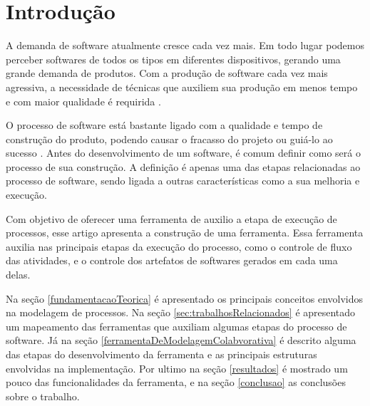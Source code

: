 \section{Introdução}\label{introducao}
A demanda de software atualmente cresce cada vez mais. Em todo lugar podemos perceber softwares de todos os tipos em diferentes dispositivos, gerando uma grande demanda de produtos. Com a produção de software cada vez mais agressiva, a necessidade de técnicas que auxiliem sua produção em menos tempo e com maior qualidade é requirida \cite{larman2007utilizando}.

O processo de software está bastante ligado com a qualidade e tempo de construção do produto, podendo causar o fracasso do projeto ou guiá-lo ao sucesso \cite{sommerville2007engenharia}.  Antes do desenvolvimento de um software, é comum definir como será o processo de sua construção. A definição é apenas uma das etapas relacionadas ao processo de software, sendo ligada a outras características como a sua melhoria e execução.

Com objetivo de oferecer uma ferramenta de auxilio a etapa de execução de processos, esse artigo apresenta a construção de uma ferramenta. Essa ferramenta auxilia nas principais etapas da execução do processo, como o controle de fluxo das atividades, e o controle dos artefatos de softwares gerados em cada uma delas.

Na seção \ref{fundamentacaoTeorica} é apresentado os principais conceitos envolvidos na modelagem de processos. Na seção \ref{sec:trabalhosRelacionados} é apresentado um mapeamento das ferramentas que auxiliam algumas etapas do processo de software. Já na seção \ref{ferramentaDeModelagemColabvorativa} é descrito alguma das etapas do desenvolvimento da ferramenta e as principais estruturas envolvidas na implementação. Por ultimo na seção \ref{resultados} é mostrado um pouco das funcionalidades da ferramenta, e na seção \ref{conclusao} as conclusões sobre o trabalho.